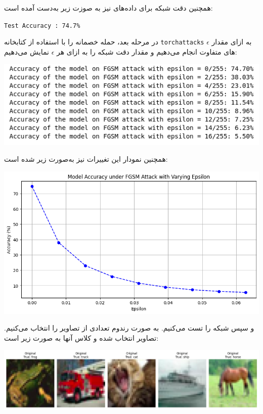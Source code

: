 \begin{qsolve}
	همچنین دقت شبکه برای داده‌های  نیز به صوزت زیر به‌دست آمده است:
	
\begin{latin}
	\texttt{Test Accuracy : 74.7\%}
\end{latin}

در مرحله بعد، حمله خصمانه  را با استفاده از کتابخانه \texttt{torchattacks} به ازای مقدار $\epsilon$ های متفاوت انجام می‌دهیم و مقدار دقت شبکه را به ازای هر $\epsilon$ نمایش می‌دهیم:

\begin{center}
	\includegraphics*[width=0.7\linewidth]{pics/img6.png}
	\label{روند تغییر دقت شبکه به ازای اپسیلون های متفاوت}
\end{center}


همچنین نمودار این تغییرات نیز به‌صورت زیر شده است:
\begin{center}
	\includegraphics*[width=0.8\linewidth]{pics/img7.png}
	\label{نمودار تغییرات دقت شبکه به ازای اپسیلون های متفاوت}
\end{center}

و سپس شبکه را تست می‌کنیم. به صورت رندوم تعدادی از تصاویر را انتخاب می‌کنیم. تصاویر انتخاب شده و کلاس آنها به صورت زیر است:

\begin{center}
	\includegraphics*[width=0.8\linewidth]{pics/img8.png}
	\label{تصاویر رندوم انتخاب شده}
\end{center}

\end{qsolve}





